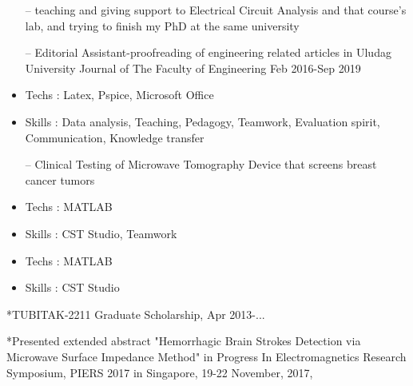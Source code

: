 \documentclass[10pt,a4paper,ragged2e,withhyper]{altacv}
\begin{document}
\begin{paracol}{1}
\begin{itemize}
    \setlength{\itemindent}{0.5em}
    \item[--]   \small {teaching and giving support to Electrical Circuit Analysis and that
    course's lab, and trying to finish my PhD at the same university }
    \item[--]   \small {Editorial Assistant-proofreading of engineering related articles in Uludag University Journal of The Faculty of Engineering Feb 2016-Sep 2019}
    \item Techs : Latex, Pspice, Microsoft Office
    \item Skills : Data analysis, Teaching, Pedagogy, Teamwork, Evaluation spirit, Communication, Knowledge transfer
\end{itemize}
\begin{itemize}
  \setlength{\itemindent}{0.5em}
    \item[--]  \small {Clinical Testing of Microwave Tomography Device that screens breast cancer tumors}
  \item Techs : MATLAB
   \item Skills : CST Studio, Teamwork
\end{itemize}
\begin{itemize}
    \setlength{\itemindent}{0.5em}
    \item Techs : MATLAB
   \item Skills : CST Studio
\end{itemize}

*TUBITAK-2211 Graduate Scholarship, Apr 2013-...

*Presented extended abstract "Hemorrhagic Brain Strokes Detection via Microwave Surface Impedance Method" in Progress In Electromagnetics Research Symposium, PIERS 2017 in Singapore, 19-22 November, 2017,


\end{paracol}
\end{document}
